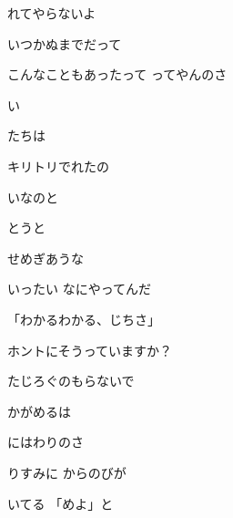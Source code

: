 \documentclass[a4paper,tate,twocolumn,12pt]{ltjtarticle}
\begin{document}
\begin{flushleft}
\begin{minipage}{\linewidth}
れてやらないよ

いつかぬまでだって

こんなこともあったって ってやんのさ
\end{minipage}

\vspace{2em}

\noindent\begin{minipage}{\linewidth}
い 

たちは

キリトリでれたの
\end{minipage}

\vspace{2em}

\noindent\begin{minipage}{\linewidth}
いなのと

とうと

せめぎあうな

いったい なにやってんだ
\end{minipage}

\vspace{2em}

\noindent\begin{minipage}{\linewidth}
「わかるわかる、じちさ」

ホントにそうっていますか？

たじろぐのもらないで
\end{minipage}

\vspace{2em}

\noindent\begin{minipage}{\linewidth}
かがめるは

にはわりのさ

りすみに からのびが

いてる 「めよ」と


\end{minipage}
\end{flushleft}
\end{document}
